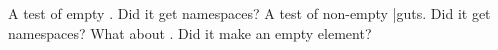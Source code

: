 \documentclass{article}
\begin{document}
A test of empty \foo.
Did it get namespaces?
A test of non-empty \bar{guts}.
Did it get namespaces?
What about \baz.
Did it make an empty element?
\end{document}
